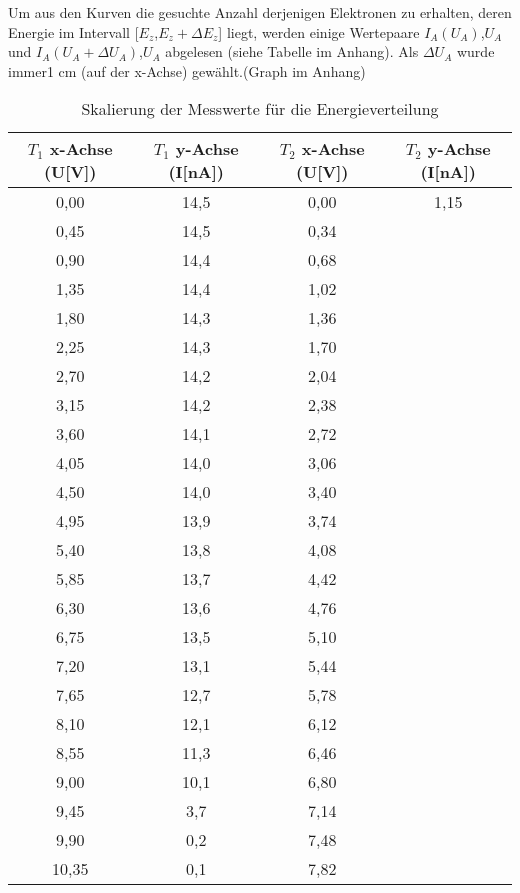 Um aus den Kurven die gesuchte Anzahl derjenigen Elektronen zu erhalten,
deren Energie im Intervall [$E_z$,$E_z + \Delta E_z$] liegt, werden einige Wertepaare
$I_A(U_A)$,$U_A$ und $I_A(U_A+ \Delta U_A)$,$U_A$ abgelesen (siehe Tabelle im Anhang). Als $\Delta U_A$
wurde immer1 cm (auf der x-Achse) gewählt.(Graph im Anhang)

\begin{table}[h]
\begin{center}
\begin{tabular}[c]{|c|c||c|c|} \hline
$T_1$ x-Achse (U[V]) & $T_1$ y-Achse (I[nA]) & $T_2$ x-Achse (U[V]) & $T_2$ y-Achse (I[nA]) \\ \hline
0,00  & 14,5	 & 0,00 & 1,15\\
0,45  & 14,5	 & 0,34 & \\
0,90  & 14,4	 & 0,68 & \\
1,35  & 14,4	 & 1,02 & \\
1,80  & 14,3	 & 1,36 & \\
2,25  & 14,3	 & 1,70 & \\
2,70  & 14,2	 & 2,04 & \\
3,15  & 14,2	 & 2,38 & \\
3,60  & 14,1	 & 2,72 & \\
4,05  & 14,0	 & 3,06 & \\
4,50  & 14,0	 & 3,40 & \\
4,95  & 13,9	 & 3,74 & \\ 
5,40  & 13,8	 & 4,08 & \\
5,85  & 13,7	 & 4,42 & \\
6,30  & 13,6	 & 4,76 & \\
6,75  & 13,5	 & 5,10 & \\
7,20  & 13,1	 & 5,44 & \\
7,65  & 12,7	 & 5,78 & \\
8,10  & 12,1	 & 6,12 & \\
8,55  & 11,3	 & 6,46 & \\
9,00  & 10,1	 & 6,80 & \\
9,45  & 3,7	 & 7,14 & \\
9,90  & 0,2	 & 7,48 & \\ 
10,35& 0,1	 & 7,82 & \\ \hline 
\end{tabular}
\caption{Skalierung der Messwerte für die Energieverteilung}
\end{center}
\end{table}


